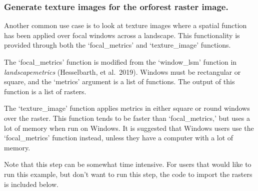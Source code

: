 \documentclass[
]{article}
\begin{document}
\hypertarget{generate-texture-images-for-the-orforest-raster-image.}{%
\subsubsection{Generate texture images for the orforest raster
image.}\label{generate-texture-images-for-the-orforest-raster-image.}}

Another common use case is to look at texture images where a spatial
function has been applied over focal windows across a landscape. This
functionality is provided through both the `focal\_metrics' and
`texture\_image' functions.

The `focal\_metrics' function is modified from the `window\_lsm'
function in \emph{landscapemetrics} (Hesselbarth, et al.~2019). Windows
must be rectangular or square, and the `metrics' argument is a list of
functions. The output of this function is a list of rasters.

The `texture\_image' function applies metrics in either square or round
windows over the raster. This function tends to be faster than
`focal\_metrics,' but uses a lot of memory when run on Windows. It is
suggested that Windows users use the `focal\_metrics' function instead,
unless they have a computer with a lot of memory.

Note that this step can be somewhat time intensive. For users that would
like to run this example, but don't want to run this step, the code to
import the rasters is included below.
\end{document}
